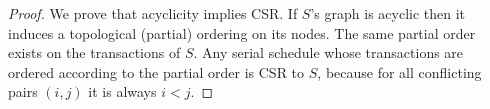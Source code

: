 \begin{proof}
    We prove that acyclicity implies CSR. 
    If $S$'s graph is acyclic then it induces a topological (partial) ordering on its nodes. 
    The same partial order exists on the transactions of $S$. 
    Any serial schedule whose transactions are ordered according to the partial order is CSR to $S$, because for all conflicting pairs $(i,j)$ it is always $i<j$. 
\end{proof}